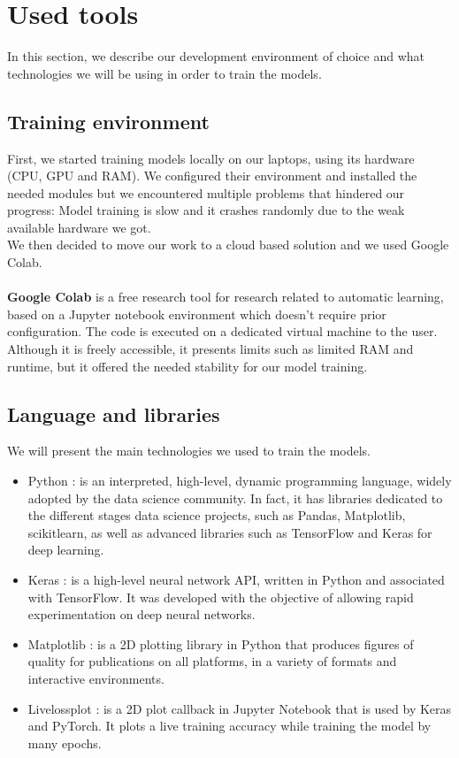 \documentclass[12pt,a4paper,oneside,english]{book}
\begin{document}
\section{Used tools}
In this section, we describe our development environment of choice and what technologies we will be using in order to train the models.
\subsection{Training environment}
First, we started training models locally on our laptops, using its hardware (CPU, GPU and RAM). We configured their environment and installed the needed modules but we encountered multiple problems that hindered our progress: Model training is slow and it crashes randomly due to the weak available hardware we got. \\
We then decided to move our work to a cloud based solution and we used Google Colab.
\\
\\
\textbf{Google Colab}\cite{googlecolab} is a free research tool for research related to automatic learning, based on a Jupyter notebook environment which doesn't require prior configuration. The code is executed on a dedicated virtual machine to the user. Although it is freely accessible, it presents limits such as limited RAM and runtime, but it offered the needed stability for our model training.
\newpage


\subsection{Language and libraries}
We will present the main technologies we used to train the models.
\begin{itemize}
\item Python \cite{python}: is an interpreted, high-level, dynamic programming language, widely adopted by the data science community. In fact, it has libraries dedicated to the different stages data science projects, such as Pandas, Matplotlib, scikitlearn, as well as advanced libraries such as TensorFlow and Keras for deep learning.
\item Keras \cite{keras}: is a high-level neural network API, written in Python and associated with TensorFlow. It was developed with the objective of allowing rapid experimentation on deep neural networks.
\item Matplotlib \cite{matplotlib}: is a 2D plotting library in Python that produces figures of quality for publications on all platforms, in a variety of formats and interactive environments.
\item Livelossplot \cite{livelossplot}: is a 2D plot callback in Jupyter Notebook that is used by Keras and PyTorch. It plots a live training accuracy while training the model by many epochs.
\end{itemize}
\end{document}
